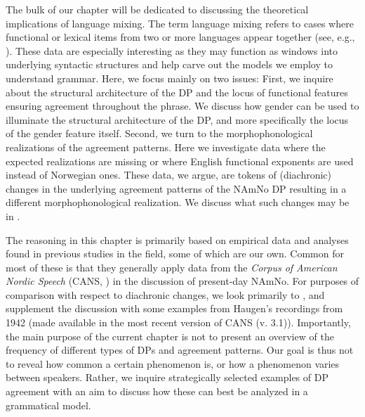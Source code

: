 \documentclass[output=paper]{langscibook}
\begin{document}
The bulk of our chapter will be dedicated to discussing the theoretical implications of language mixing. The term language mixing refers to cases where functional or lexical items from two or more languages appear together (see, e.g., \citealt{Muysken2000, Lohndal2013}). These data are especially interesting as they may function as windows into underlying syntactic structures and help carve out the models we employ to understand grammar. Here, we focus mainly on two issues: First, we inquire about the structural architecture of the DP and the locus of functional features ensuring agreement throughout the phrase. We discuss how gender can be used to illuminate the structural architecture of the DP, and more specifically the locus of the gender feature itself. Second, we turn to the morphophonological realizations of the agreement patterns. Here we investigate data where the expected realizations are missing or where English functional exponents are used instead of Norwegian ones. These data, we argue, are tokens of (diachronic) changes in the underlying agreement patterns of the NAmNo DP resulting in a different morphophonological realization. We discuss what such changes may be in .  



The reasoning in this chapter is primarily based on empirical data and analyses found in previous studies in the field, some of which are our own. Common for most of these is that they generally apply data from the \textit{Corpus of American Nordic Speech} (CANS, \citealt{Johannessen2015CANS}) in the discussion of present-day NAmNo. For purposes of comparison with respect to diachronic changes, we look primarily to \citet{Haugen1953}, and supplement the discussion with some examples from Haugen’s recordings from 1942 (made available in the most recent version of CANS (v. 3.1)). Importantly, the main purpose of the current chapter is not to present an overview of the frequency of different types of DPs and agreement patterns. Our goal is thus not to reveal how common a certain phenomenon is, or how a phenomenon varies between speakers. Rather, we inquire strategically selected examples of DP agreement with an aim to discuss how these can best be analyzed in a grammatical model. 
\end{document}

